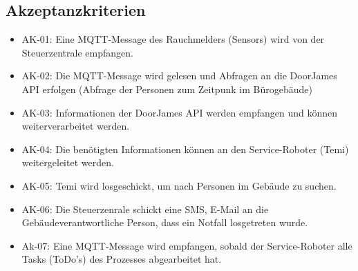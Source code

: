 \documentclass[
  ngerman           %
  ,twoside          %
  ,11pt
  ,pdftex
]{report}
\begin{document}
\subsection*{Akzeptanzkriterien}
\begin{itemize}
    \item AK-01: Eine MQTT-Message des Rauchmelders (Sensors) wird von der Steuerzentrale empfangen.
    \item AK-02: Die MQTT-Message wird gelesen und Abfragen an die DoorJames API erfolgen (Abfrage der Personen zum Zeitpunk im Bürogebäude)
    \item AK-03: Informationen der DoorJames API werden empfangen und können weiterverarbeitet werden. 
    \item AK-04: Die benötigten Informationen können an den Service-Roboter (Temi) weitergeleitet werden.
    \item AK-05: Temi wird losgeschickt, um nach Personen im Gebäude zu suchen.
    \item AK-06: Die Steuerzenrale schickt eine SMS, E-Mail an die Gebäudeverantwortliche Person, dass ein Notfall losgetreten wurde.
    \item Ak-07: Eine MQTT-Message wird empfangen, sobald der Service-Roboter alle Tasks (ToDo's)  des Prozesses abgearbeitet hat. 
\end{itemize}

\begin{landscape}
  
\end{landscape}
\end{document}
